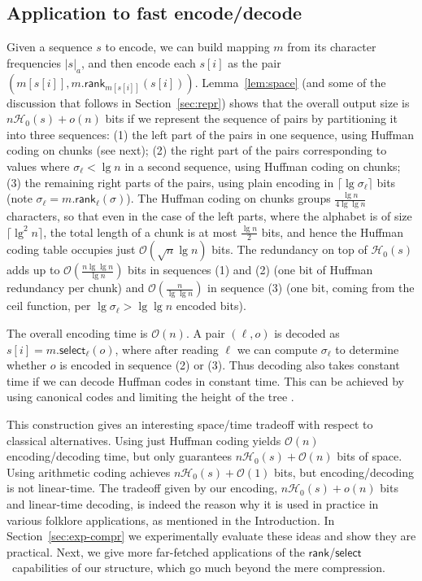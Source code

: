 \documentclass[11pt]{article}
\newcommand{\Oh}[1]
    {\ensuremath{\mathcal{O}\left( {#1} \right)}}
\newcommand{\occ}[2]
    {\ensuremath{|{#2}|_{#1}}}
\newcommand{\rank}
    {\ensuremath{\mathsf{rank}}}
\newcommand{\select}
    {\ensuremath{\mathsf{select}}}
\newcommand{\HH}{\mathcal{H}}
\newcommand{\Ho}{\HH_0}
\newcommand{\mapping}{\ensuremath{{m}}}
\begin{document}
\subsection{Application to fast encode/decode}

Given a sequence $s$ to encode, we can build mapping $\mapping$ from its
character frequencies $\occ{a}{s}$, and then encode each $s[i]$ as the pair
$(m[s[i]], m.\rank_{m[s[i]]}(s[i]))$. 
Lemma~\ref{lem:space} (and some of the discussion that 
follows in Section~\ref{sec:repr}) shows that the overall output size is
$n\Ho(s)+o(n)$ bits if we represent the sequence of pairs 
by partitioning it into three sequences: (1) the left part of the pairs in one 
sequence, using Huffman coding on chunks (see next); (2) the right part of the 
pairs corresponding to values where $\sigma_\ell < \lg n$ in a second sequence, 
using Huffman coding on chunks; (3) the remaining right parts of the pairs, 
using plain encoding in $\lceil \lg \sigma_\ell \rceil$ bits (note 
$\sigma_\ell = m.\rank_\ell(\sigma)$). The Huffman coding on chunks groups
$\frac{\lg n}{4\lg\lg n}$ characters, so that even in the case of the left 
parts, where the alphabet is of size $\lceil \lg^2 n \rceil$, the total length 
of a chunk is at most $\frac{\lg n}{2}$ bits, and hence the Huffman coding
table occupies just $\Oh{\sqrt{n}\lg n}$ bits. 
The redundancy on top of $\Ho(s)$ adds up to $\Oh{\frac{n \lg\lg n}{\lg n}}$ 
bits in sequences (1) and (2) (one bit
of Huffman redundancy per chunk) and $\Oh{\frac{n}{\lg\lg n}}$ in sequence (3) 
(one bit, coming from the ceil function, per $\lg \sigma_\ell > \lg\lg n$
encoded bits).

The overall encoding time is $\Oh{n}$. A pair $(\ell,o)$ is 
decoded as $s[i] = m.\select_\ell (o)$, where after reading $\ell$ we can
compute $\sigma_\ell$ to determine whether $o$ is encoded in sequence (2) or
(3). Thus decoding also takes constant time if we can decode Huffman codes in
constant time. This can be achieved by using canonical codes and limiting the
height of the tree \cite{MT97,GN09}. 

This construction gives an interesting space/time tradeoff with respect to
classical alternatives. Using just Huffman coding yields $\Oh{n}$
encoding/decoding time, but only guarantees $n\Ho(s)+\Oh{n}$ bits of space. 
Using arithmetic coding achieves $n\Ho(s)+\Oh{1}$ bits, but encoding/decoding
is not linear-time. The tradeoff given by our encoding, $n\Ho(s)+o(n)$ bits
and linear-time decoding, is indeed the
reason why it is used in practice in various folklore applications, as
mentioned in the Introduction. In Section~\ref{sec:exp-compr} we
experimentally evaluate these ideas and show they are practical. 
Next, we give more far-fetched applications
of the \rank/\select\ capabilities of our structure, which go much beyond
the mere compression.
\end{document}
